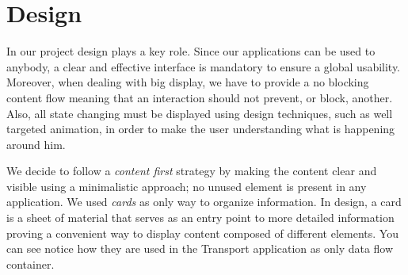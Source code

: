 \documentclass[]{usiinfbachelorproject}
\begin{document}
\section{Design}
In our project design plays a key role. Since our applications can be used to anybody, a clear and effective interface is mandatory to ensure a global usability. Moreover, when dealing with big display, we have to provide a no blocking content flow meaning that an interaction should not prevent, or block, another. Also, all state changing must be displayed using design techniques, such as well targeted animation, in order to make the user understanding what is happening around him.

We decide to follow a \emph{content first} strategy by making the content clear and visible using a minimalistic approach; no unused element is present in any application. We used \emph{cards} as only way to organize information. In design, a card is a sheet of material that serves as an entry point to more detailed information proving a convenient way to display content composed of different elements.
You can see notice how they are used in the Transport application as only data flow container.
\end{document}

